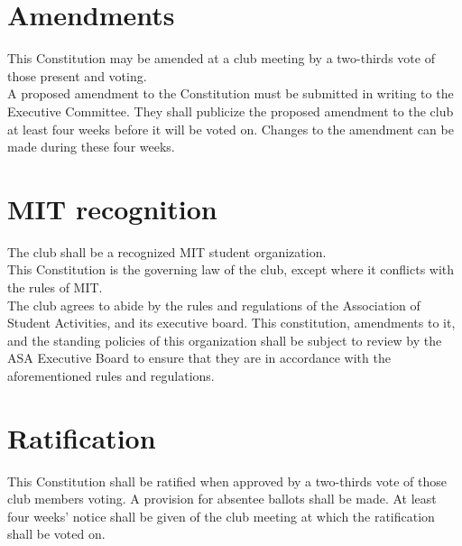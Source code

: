 \documentclass{article}
\begin{document}
\section {Amendments}
This Constitution may be amended at a club meeting by a two-thirds vote of
those present and voting.\\
A proposed amendment to the Constitution must be submitted in writing to the Executive Committee. They shall publicize the proposed amendment to the club at least four weeks before it will be voted on. Changes to the amendment can be made during these four weeks. 
\section {MIT recognition}
The club shall be a recognized MIT student organization.\\
This Constitution is the governing law of the club, except where it
conflicts with the rules of MIT.\\
The club agrees to abide by the rules and regulations of the
Association of Student Activities, and its executive board. This
constitution, amendments to it, and the standing policies of this organization
shall be subject to review by the ASA Executive Board to ensure that
they are in accordance with the aforementioned rules and regulations.
\section{Ratification}
This Constitution shall be ratified when approved by a two-thirds vote of
those club members voting.  A provision for absentee ballots shall be made.
At least four weeks' notice shall be given of the club meeting at which
the ratification shall be voted on.\\
\end{document}
